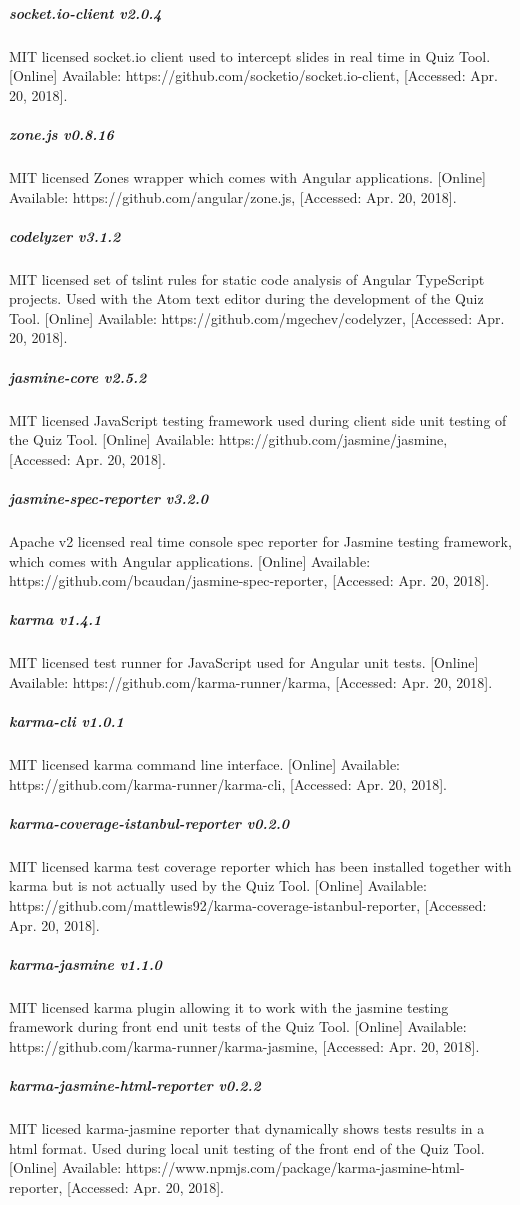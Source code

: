 \subparagraph{socket.io-client v2.0.4}
MIT licensed socket.io client used to intercept slides in real time in Quiz Tool.
[Online] Available: https://github.com/socketio/socket.io-client, [Accessed: Apr. 20, 2018].

\subparagraph{zone.js v0.8.16}
MIT licensed Zones wrapper which comes with Angular applications.
[Online] Available: https://github.com/angular/zone.js, [Accessed: Apr. 20, 2018].

\subparagraph{codelyzer v3.1.2}
MIT licensed set of tslint rules for static code analysis of Angular TypeScript projects.
Used with the Atom text editor during the development of the Quiz Tool.
[Online] Available: https://github.com/mgechev/codelyzer, [Accessed: Apr. 20, 2018].

\subparagraph{jasmine-core v2.5.2}
MIT licensed JavaScript testing framework used during client side unit testing of the Quiz Tool.
[Online] Available: https://github.com/jasmine/jasmine, [Accessed: Apr. 20, 2018].

\subparagraph{jasmine-spec-reporter v3.2.0}
Apache v2 licensed real time console spec reporter for Jasmine testing framework, which comes
with Angular applications.
[Online] Available: https://github.com/bcaudan/jasmine-spec-reporter, [Accessed: Apr. 20, 2018].

\subparagraph{karma v1.4.1}
MIT licensed test runner for JavaScript used for Angular unit tests.
[Online] Available: https://github.com/karma-runner/karma, [Accessed: Apr. 20, 2018].

\subparagraph{karma-cli v1.0.1}
MIT licensed karma command line interface.
[Online] Available: https://github.com/karma-runner/karma-cli, [Accessed: Apr. 20, 2018].

\subparagraph{karma-coverage-istanbul-reporter v0.2.0}
MIT licensed karma test coverage reporter which has been installed together with karma but is
not actually used by the Quiz Tool.
[Online] Available: https://github.com/mattlewis92/karma-coverage-istanbul-reporter, [Accessed: Apr. 20, 2018].

\subparagraph{karma-jasmine v1.1.0}
MIT licensed karma plugin allowing it to work with the jasmine testing framework during front end unit tests of
the Quiz Tool.
[Online] Available: https://github.com/karma-runner/karma-jasmine, [Accessed: Apr. 20, 2018].

\subparagraph{karma-jasmine-html-reporter v0.2.2}
MIT licesed karma-jasmine reporter that dynamically shows tests results in a html format.
Used during local unit testing of the front end of the Quiz Tool.
[Online] Available: https://www.npmjs.com/package/karma-jasmine-html-reporter, [Accessed: Apr. 20, 2018].


